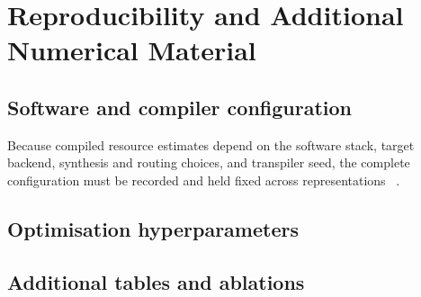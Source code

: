 \documentclass[a4paper,onecolumn,11pt,unpublished]{quantumarticle}
\newcommand{\blankcontent}{\noindent\mbox{}\par}
\theoremstyle{remark}
\begin{document}
\section{Reproducibility and Additional Numerical Material}
\label{app:reproducibility}

\subsection{Software and compiler configuration}
Because compiled resource estimates depend on the software stack, target
backend, synthesis and routing choices, and transpiler seed, the complete
configuration must be recorded and held fixed across representations
~\cite{Weidenfeller2022,Schmidbauer2024,Schmidbauer2026}.
\blankcontent

\subsection{Optimisation hyperparameters}
\blankcontent

\subsection{Additional tables and ablations}
\blankcontent

\end{document}
